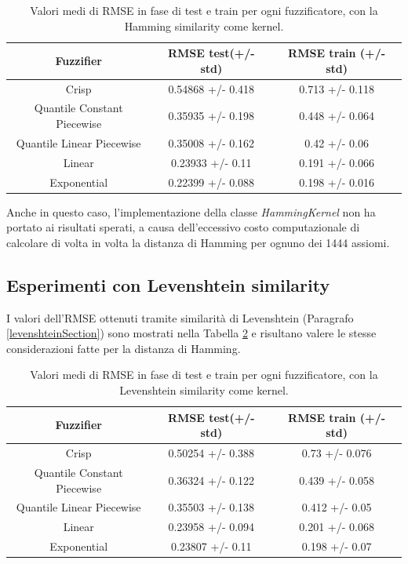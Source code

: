 \documentclass[12pt,a4paper]{report}
\begin{document}
\begin{table}[h!]
\small
\centering 	
	\begin{tabular}{|c|c|c|} 
	 \hline
	  Fuzzifier & RMSE test(+/- std) & RMSE train (+/- std)\\ [0.5ex] 
	 \hline
	 Crisp & 0.54868 +/- 0.418 & 0.713 +/- 0.118 \\ 
	 \hline
	 Quantile Constant Piecewise & 0.35935 +/- 0.198 & 0.448 +/- 0.064\\
	 \hline
	 Quantile Linear Piecewise & 0.35008 +/- 0.162 & 0.42 +/- 0.06\\
	 \hline
	 Linear &0.23933 +/- 0.11 & 0.191 +/- 0.066\\
	 \hline
	 Exponential & 0.22399 +/- 0.088 & 0.198 +/- 0.016\\ [1ex] 
	 \hline
	\end{tabular}
	\caption{Valori medi di RMSE in fase di test e train per ogni fuzzificatore, con la Hamming similarity come kernel.}
	\label{table:risultatiHamming}
\end{table}

Anche in questo caso, l'implementazione della classe \emph{HammingKernel} non ha portato ai risultati sperati, a causa dell'eccessivo costo computazionale di calcolare di volta in volta la distanza di Hamming per ognuno dei 1444 assiomi.

\subsection{Esperimenti con Levenshtein similarity}
\label{esperimentiLevenshtein}
 I valori dell'RMSE ottenuti tramite similarità di Levenshtein (Paragrafo \ref{levenshteinSection}) sono mostrati nella Tabella \ref{table:risultatiLevenshtein} e risultano valere le stesse considerazioni fatte per la distanza di Hamming.


\begin{table}[h!]
\small
\centering 	
	\begin{tabular}{|c|c|c|} 
	 \hline
	  Fuzzifier & RMSE test(+/- std) & RMSE train (+/- std)\\ [0.5ex] 
	 \hline
	 Crisp & 0.50254 +/- 0.388 & 0.73 +/- 0.076 \\ 
	 \hline
	 Quantile Constant Piecewise & 0.36324 +/- 0.122 & 0.439 +/- 0.058\\
	 \hline
	 Quantile Linear Piecewise & 0.35503 +/- 0.138	 & 0.412 +/- 0.05\\
	 \hline
	 Linear & 0.23958 +/- 0.094 & 0.201 +/- 0.068\\
	 \hline
	 Exponential & 0.23807 +/- 0.11 & 0.198 +/- 0.07\\ [1ex] 
	 \hline
	\end{tabular}
	\caption{Valori medi di RMSE in fase di test e train per ogni fuzzificatore, con la Levenshtein similarity come kernel.}
	\label{table:risultatiLevenshtein}
\end{table}
\end{document}
